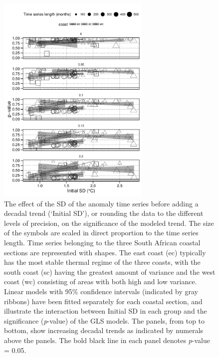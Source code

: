 \documentclass[]{ametsoc}
\begin{document}
\begin{figure}
\centering \includegraphics[width=0.65\textwidth]{figure05}
\caption{The effect of the SD of the anomaly time series before adding a decadal trend (`Initial SD'), or rounding the data to the different levels of precision, on the significance of the modeled trend. The size of the symbols are scaled in direct proportion to the time series length. Time series belonging to the three South African coastal sections are represented with shapes. The east coast (ec) typically has the most stable thermal regime of the three coasts, with the south coast (sc) having the greatest amount of variance and the west coast (wc) consisting of areas with both high and low variance. Linear models with 95\% confidence intervals (indicated by gray ribbons) have been fitted separately for each coastal section, and illustrate the interaction between Initial SD in each group and the significance (\emph{p}-value) of the GLS models. The panels, from top to bottom, show increasing decadal trends as indicated by numerals above the panels. The bold black line in each panel denotes \emph{p}-value = 0.05.}
\label{figure05}
\end{figure}
\end{document}
